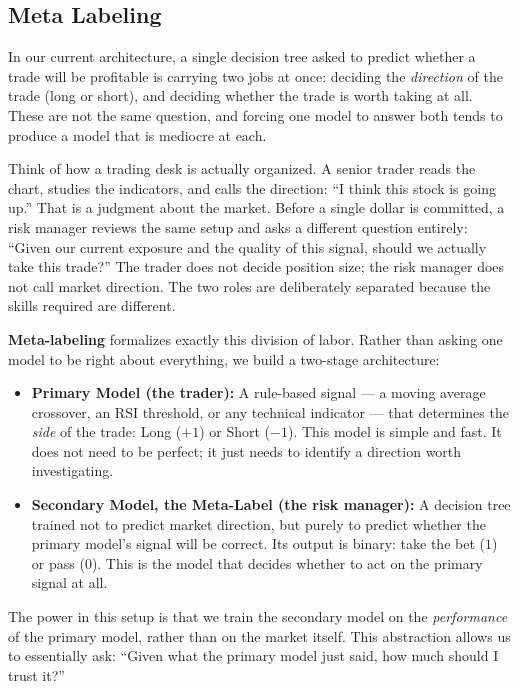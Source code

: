 

\subsection{Meta Labeling}

In our current architecture, a single decision tree asked to predict whether a trade will be profitable is carrying two jobs at once: deciding the \textit{direction} of the trade (long or short), and deciding whether the trade is worth taking at all. 
These are not the same question, and forcing one model to answer both tends to produce a model that is mediocre at each.
 
Think of how a trading desk is actually organized. 
A senior trader reads the chart, studies the indicators, and calls the direction: ``I think this stock is going up.'' 
That is a judgment about the market. 
Before a single dollar is committed, a risk manager reviews the same setup and asks a different question entirely: ``Given our current exposure and the quality of this signal, should we actually take this trade?''
The trader does not decide position size; the risk manager does not call market direction. The two roles are deliberately separated because the skills required are different.
 
\textbf{Meta-labeling} formalizes exactly this division of labor. Rather than asking one model to be right about everything, we build a two-stage architecture:
 
\begin{itemize}
  \item \textbf{Primary Model (the trader):} A rule-based signal --- a moving average crossover, an RSI threshold, or any technical indicator --- that determines the \textit{side} of the trade: Long ($+1$) or Short ($-1$). This model is simple and fast. It does not need to be perfect; it just needs to identify a direction worth investigating.
  \item \textbf{Secondary Model, the Meta-Label (the risk manager):} A decision tree trained not to predict market direction, but purely to predict whether the primary model's signal will be correct. Its output is binary: take the bet ($1$) or pass ($0$). This is the model that decides whether to act on the primary signal at all.
\end{itemize}

The power in this setup is that we train the secondary model on the \textit{performance} of the primary model, rather than on the market itself.
This abstraction allows us to essentially ask: ``Given what the primary model just said, how much should I trust it?''

